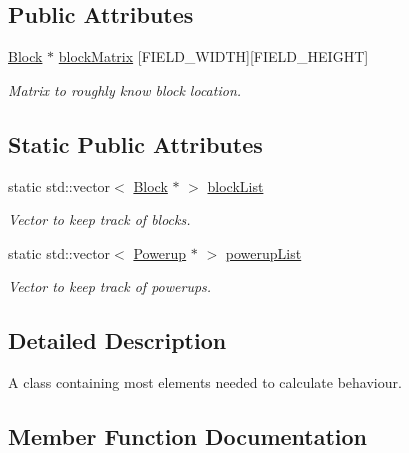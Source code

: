 \subsection*{Public Attributes}
\begin{DoxyCompactItemize}
\item 
\hyperlink{class_block}{Block} $\ast$ \hyperlink{class_game_field_a5b6cafcddfb83370e71363fc7b46a6f7}{block\+Matrix} \mbox{[}F\+I\+E\+L\+D\+\_\+\+W\+I\+D\+TH\mbox{]}\mbox{[}F\+I\+E\+L\+D\+\_\+\+H\+E\+I\+G\+HT\mbox{]}
\begin{DoxyCompactList}\small\item\em Matrix to roughly know block location. \end{DoxyCompactList}\end{DoxyCompactItemize}
\subsection*{Static Public Attributes}
\begin{DoxyCompactItemize}
\item 
\mbox{\label{class_game_field_a993a881f800ac9c73cea3060eea16aea}} 
static std\+::vector$<$ \hyperlink{class_block}{Block} $\ast$ $>$ \hyperlink{class_game_field_a993a881f800ac9c73cea3060eea16aea}{block\+List}
\begin{DoxyCompactList}\small\item\em Vector to keep track of blocks. \end{DoxyCompactList}\item 
\mbox{\label{class_game_field_a73fb44513fda2f45f7ddfe589222067c}} 
static std\+::vector$<$ \hyperlink{class_powerup}{Powerup} $\ast$ $>$ \hyperlink{class_game_field_a73fb44513fda2f45f7ddfe589222067c}{powerup\+List}
\begin{DoxyCompactList}\small\item\em Vector to keep track of powerups. \end{DoxyCompactList}\end{DoxyCompactItemize}


\subsection{Detailed Description}
A class containing most elements needed to calculate behaviour. 

\subsection{Member Function Documentation}
\mbox{\label{class_game_field_ac5ab828d2d8dbabc75dedfc8f699a42c}} 
